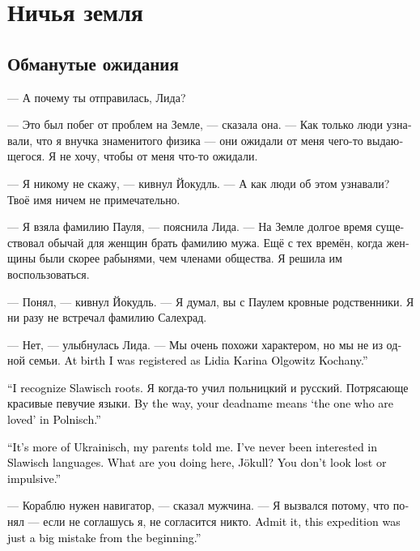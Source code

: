\documentclass[a4paper,12pt,fleqn]{book}\usepackage{cooltooltips}\usepackage{polyglossia}\setdefaultlanguage[babelshorthands=true]{russian}\setotherlanguage{english}\defaultfontfeatures{Ligatures=TeX,Mapping=tex-text} \usepackage{xcolor}\definecolor{lightgray}{HTML}{bbbbbb}\color{lightgray}\newcommand{\ml}[3]{\textenglish{\textcolor{black}{#3}}}
\begin{document}
\chapter{Ничья земля}

\section{Обманутые ожидания}

--- А почему ты отправилась, Лида?

--- Это был побег от проблем на Земле, --- сказала она.
--- Как только люди узнавали, что я внучка знаменитого физика --- они ожидали от меня чего-то выдающегося.
Я не хочу, чтобы от меня что-то ожидали.

--- Я никому не скажу, --- кивнул Йокудль.
--- А как люди об этом узнавали?
Твоё имя ничем не примечательно.

--- Я взяла фамилию Пауля, --- пояснила Лида.
--- На Земле долгое время существовал обычай для женщин брать фамилию мужа.
Ещё с тех времён, когда женщины были скорее рабынями, чем членами общества.
Я решила им воспользоваться.

--- Понял, --- кивнул Йокудль.
--- Я думал, вы с Паулем кровные родственники.
Я ни разу не встречал фамилию Салехрад. %

--- Нет, --- улыбнулась Лида.
--- Мы очень похожи характером, но мы не из одной семьи.
\ml{$0$}
{При рождении я была записана как Лидия Карина Ольговиц Коханый.}
{At birth I was registered as Lidia Karina Olgowitz Kochany.''}

\ml{$0$}
{--- Чую славицкие корни.}
{``I recognize Slawisch roots.}
Я когда-то учил польницкий и русский.
Потрясающе красивые певучие языки.
\ml{$0$}
{Кстати, твоя старая фамилия на польницком означает <<тот, кого любят>>.}
{By the way, your deadname means `the one who are loved' in Polnisch.''}

\ml{$0$}
{--- Она скорее украйницкая, как мне говорили родители.}
{``It's more of Ukrainisch, my parents told me.}
\ml{$0$}
{Никогда не интересовалась славицкими языками.}
{I've never been interested in Slawisch languages.}
\ml{$0$}
{А что ты здесь делаешь, Йокудль?}
{What are you doing here, Jökull?}
\ml{$0$}
{Ты не выглядишь потерянным или импульсивным.}
{You don't look lost or impulsive.''}

--- Кораблю нужен навигатор, --- сказал мужчина.
--- Я вызвался потому, что понял --- если не соглашусь я, не согласится никто.
\ml{$0$}
{Признай --- эта экспедиция изначально была ошибкой.}
{Admit it, this expedition was just a big mistake from the beginning.''}
\end{document}
